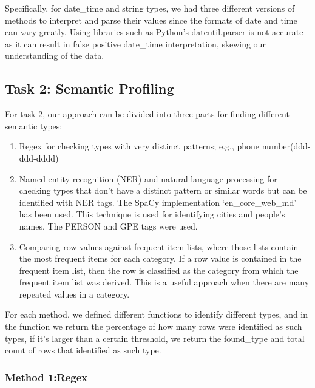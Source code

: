 \documentclass[sigconf,authordraft]{acmart}
\begin{document}
Specifically, for date\_time and string types, we had three different versions of methods to interpret
and parse their values since the formats of date and time can vary greatly. Using libraries
such as Python’s dateutil.parser is not accurate as it can result in false positive date\_time
interpretation, skewing our understanding of the data.





\subsection{Task 2: Semantic Profiling}
For task 2, our approach can be divided into three parts for finding different semantic types:
\begin{enumerate}
    \item Regex for checking types with very distinct patterns; e.g., phone number(ddd-ddd-dddd) 
    \item Named-entity recognition (NER) and natural language processing for checking types that don’t have a distinct pattern or similar words but can be identified with NER tags. The SpaCy implementation ‘en\_core\_web\_md’ has been used. This technique is used for
    identifying cities and people’s names. The PERSON and GPE tags were used.
    \item Comparing row values against frequent item lists, where those lists contain the most
frequent items for each category. If a row value is contained in the frequent item list, then
the row is classified as the category from which the frequent item list was derived. This is
a useful approach when there are many repeated values in a category.
\end{enumerate}
For each method, we defined different functions to identify different types, and in the function we
return the percentage of how many rows were identified as such types, if it’s larger than a certain
threshold, we return the found\_type and total count of rows that identified as such type.


\subsubsection{Method 1:Regex}
\end{document}
